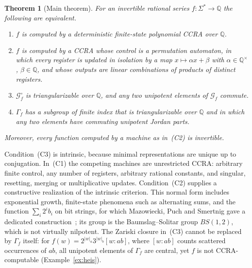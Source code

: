 \documentclass[11pt,letterpaper]{article}
\newcommand{\Q}{\mathbb{Q}}
\newcommand{\cG}{\mathcal{G}}
\newtheorem{theorem}{Theorem}
\theoremstyle{definition}
\begin{document}
\begin{theorem}[Main theorem]\label{thm:main}
For an invertible rational series $f:\Sigma^*\to\Q$ the following are equivalent.
\begin{enumerate}
\item[(C1)] $f$ is computed by a deterministic finite-state polynomial CCRA over $\Q$.
\item[(C2)] $f$ is computed by a CCRA whose control is a permutation automaton, in which every register is updated in isolation by a map $x\mapsto\alpha x+\beta$ with $\alpha\in\Q^\times$, $\beta\in\Q$, and whose outputs are linear combinations of products of distinct registers.
\item[(C3)] $\cG_f^\circ$ is triangularizable over $\Q$, and any two unipotent elements of $\cG_f$ commute.
\item[(C4)] $\Gamma_f$ has a subgroup of finite index that is triangularizable over $\Q$ and in which any two elements have commuting unipotent Jordan parts.
\end{enumerate}
Moreover, every function computed by a machine as in~(C2) is invertible.
\end{theorem}

Condition~(C3) is intrinsic, because minimal representations are unique up to conjugation. In~(C1) the competing machines are unrestricted CCRA: arbitrary finite control, any number of registers, arbitrary rational constants, and singular, resetting, merging or multiplicative updates. Condition~(C2) supplies a constructive realization of the intrinsic criterion. This normal form includes exponential growth, finite-state phenomena such as alternating sums, and the function $\sum_i2^ib_i$ on bit strings, for which Mazowiecki, Puch and Smertnig gave a dedicated construction~\cite[Example~27]{MPS26}; its group is the Baumslag--Solitar group $BS(1,2)$, which is not virtually nilpotent. The Zariski closure in~(C3) cannot be replaced by $\Gamma_f$ itself: for $f(w)=2^{|w|_a}3^{|w|_b}[w:ab]$, where $[w:ab]$ counts scattered occurrences of $ab$, all unipotent elements of $\Gamma_f$ are central, yet $f$ is not CCRA-computable (Example~\ref{ex:heis}).
\end{document}

